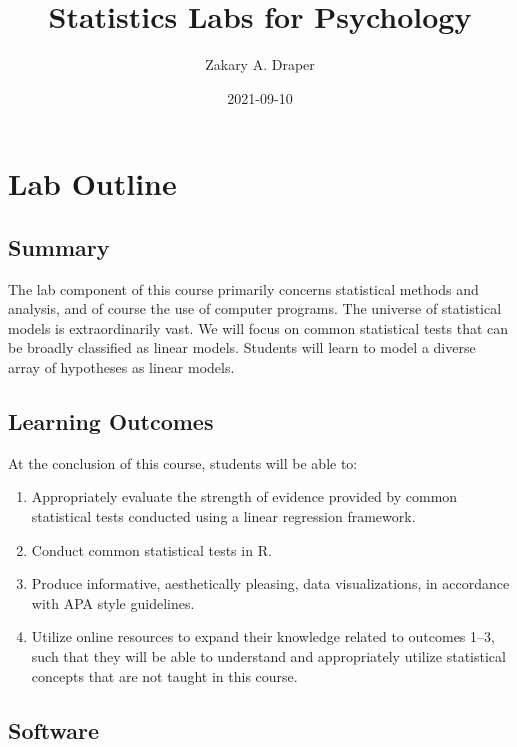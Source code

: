 \documentclass[
]{book}
\title{Statistics Labs for Psychology}
\author{Zakary A. Draper}
\date{2021-09-10}
\providecommand{\tightlist}{%
  \setlength{\itemsep}{0pt}\setlength{\parskip}{0pt}}
\begin{document}
\maketitle

{
\setcounter{tocdepth}{1}
\tableofcontents
}
\hypertarget{lab-outline}{%
\chapter*{Lab Outline}\label{lab-outline}}

\hypertarget{summary}{%
\section*{Summary}\label{summary}}

The lab component of this course primarily concerns statistical methods and analysis, and of course the use of computer programs. The universe of statistical models is extraordinarily vast. We will focus on common statistical tests that can be broadly classified as linear models. Students will learn to model a diverse array of hypotheses as linear models.

\hypertarget{learning-outcomes}{%
\section*{Learning Outcomes}\label{learning-outcomes}}

At the conclusion of this course, students will be able to:

\begin{enumerate}
\def\labelenumi{\arabic{enumi}.}
\tightlist
\item
  Appropriately evaluate the strength of evidence provided by common statistical tests conducted using a linear regression framework.
\item
  Conduct common statistical tests in R.
\item
  Produce informative, aesthetically pleasing, data visualizations, in accordance with APA style guidelines.
\item
  Utilize online resources to expand their knowledge related to outcomes 1--3, such that they will be able to understand and appropriately utilize statistical concepts that are not taught in this course.
\end{enumerate}

\hypertarget{software}{%
\section*{Software}\label{software}}
\end{document}
